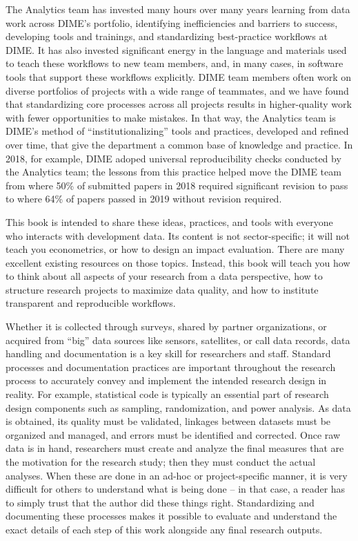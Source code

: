 The Analytics team has invested many hours over many years
learning from data work across DIME's portfolio,
identifying inefficiencies and barriers to success,
developing tools and trainings, and standardizing best-practice workflows at DIME.
It has also invested significant energy in the language and materials
used to teach these workflows to new team members,
and, in many cases, in software tools that support these workflows explicitly.
DIME team members often work on diverse portfolios of projects
with a wide range of teammates, and we have found
that standardizing core processes across all projects
results in higher-quality work with fewer opportunities to make mistakes.
In that way, the Analytics team is DIME's method of ``institutionalizing''
tools and practices, developed and refined over time,
that give the department a common base of knowledge and practice.
In 2018, for example, DIME adoped universal reproducibility checks
conducted by the Analytics team;
the lessons from this practice helped move the DIME team
from where 50\% of submitted papers in 2018
required significant revision to pass
to where 64\% of papers passed in 2019 without revision required.

This book is intended to share these ideas, practices, and tools
with everyone who interacts with development data.
Its content is not sector-specific;
it will not teach you econometrics,
or how to design an impact evaluation.
There are many excellent existing resources on those topics.
Instead, this book will teach you how to think about all aspects of your research from a data perspective,
how to structure research projects to maximize data quality,
and how to institute transparent and reproducible workflows.

Whether it is collected through surveys, shared by partner organizations,
or acquired from ``big'' data sources like sensors, satellites, or call data records,
data handling and documentation is a key skill for researchers and staff.
Standard processes and documentation practices
are important throughout the research process to accurately convey
and implement the intended research design in reality.\cite{vilhuber_lars_2020_3911311}
For example, statistical code is typically an essential part of
research design components such as sampling, randomization, and power analysis.
As data is obtained, its quality must be validated,
linkages between datasets must be organized and managed,
and errors must be identified and corrected.
Once raw data is in hand, researchers must create and analyze the final measures that
are the motivation for the research study;
then they must conduct the actual analyses.
When these are done in an ad-hoc or project-specific manner,
it is very difficult for others to understand what is being done --
in that case, a reader has to simply trust that the author did these things right.
Standardizing and documenting these processes
makes it possible to evaluate and understand
the exact details of each step of this work
alongside any final research outputs.

